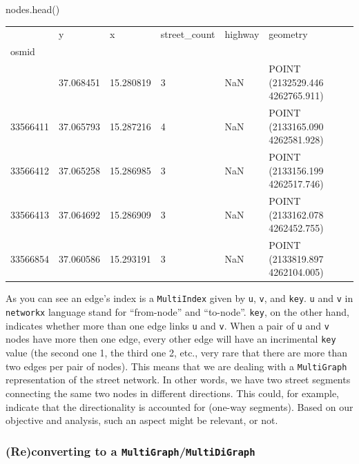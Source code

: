 \documentclass[
  letterpaper,
  DIV=11,
  numbers=noendperiod]{scrreprt}
\newenvironment{Shaded}{\begin{snugshade}}{\end{snugshade}}
\newcommand{\NormalTok}[1]{\textcolor[rgb]{0.00,0.23,0.31}{#1}}
\begin{document}
\begin{Shaded}
\begin{Highlighting}[]
\NormalTok{nodes.head()}
\end{Highlighting}
\end{Shaded}

\begin{longtable}[]{@{}llllll@{}}
\toprule\noalign{}
& y & x & street\_count & highway & geometry \\
osmid & & & & & \\
\midrule\noalign{}
\endhead
\bottomrule\noalign{}
\endlastfoot
33566408 & 37.068451 & 15.280819 & 3 & NaN & POINT (2132529.446
4262765.911) \\
33566411 & 37.065793 & 15.287216 & 4 & NaN & POINT (2133165.090
4262581.928) \\
33566412 & 37.065258 & 15.286985 & 3 & NaN & POINT (2133156.199
4262517.746) \\
33566413 & 37.064692 & 15.286909 & 3 & NaN & POINT (2133162.078
4262452.755) \\
33566854 & 37.060586 & 15.293191 & 3 & NaN & POINT (2133819.897
4262104.005) \\
\end{longtable}

As you can see an edge's index is a \texttt{MultiIndex} given by
\texttt{u}, \texttt{v}, and \texttt{key}. \texttt{u} and \texttt{v} in
\texttt{networkx} language stand for ``from-node'' and ``to-node''.
\texttt{key}, on the other hand, indicates whether more than one edge
links \texttt{u} and \texttt{v}. When a pair of \texttt{u} and
\texttt{v} nodes have more then one edge, every other edge will have an
incrimental \texttt{key} value (the second one 1, the third one 2, etc.,
very rare that there are more than two edges per pair of nodes). This
means that we are dealing with a \texttt{MultiGraph} representation of
the street network. In other words, we have two street segments
connecting the same two nodes in different directions. This could, for
example, indicate that the directionality is accounted for (one-way
segments). Based on our objective and analysis, such an aspect might be
relevant, or not.

\subsubsection{\texorpdfstring{(Re)converting to a
\texttt{MultiGraph}/\texttt{MultiDiGraph}}{(Re)converting to a MultiGraph/MultiDiGraph}}\label{reconverting-to-a-multigraphmultidigraph}
\end{document}
